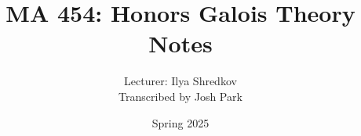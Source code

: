 \documentclass[a4paper]{article}
\title{MA 454: Honors Galois Theory Notes}
\author{Lecturer: Ilya Shredkov \\ Transcribed by Josh Park}
\date{Spring 2025}
\begin{document}
\maketitle
\tableofcontents
\pagebreak

\end{document}

